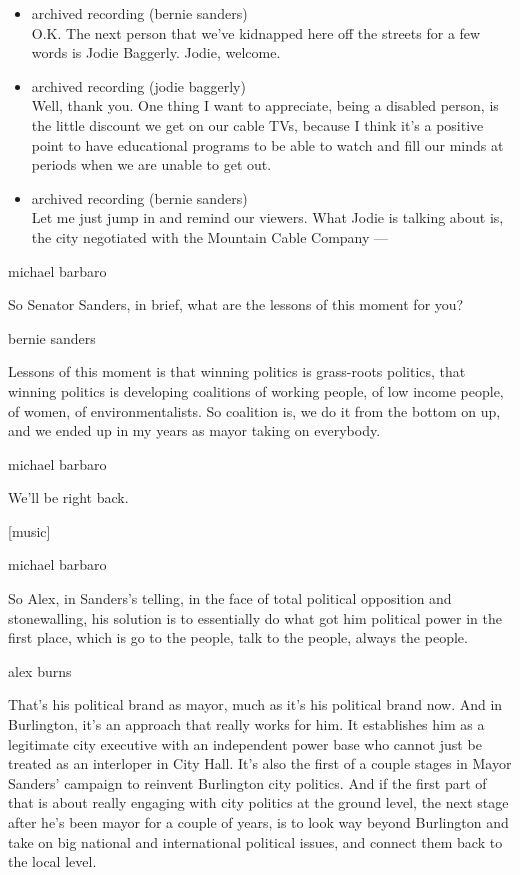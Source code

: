 \begin{itemize}
\item
  archived recording (bernie sanders)\\
  O.K. The next person that we've kidnapped here off the streets for a
  few words is Jodie Baggerly. Jodie, welcome.
\item
  archived recording (jodie baggerly)\\
  Well, thank you. One thing I want to appreciate, being a disabled
  person, is the little discount we get on our cable TVs, because I
  think it's a positive point to have educational programs to be able to
  watch and fill our minds at periods when we are unable to get out.
\item
  archived recording (bernie sanders)\\
  Let me just jump in and remind our viewers. What Jodie is talking
  about is, the city negotiated with the Mountain Cable Company ---
\end{itemize}

michael barbaro

So Senator Sanders, in brief, what are the lessons of this moment for
you?

bernie sanders

Lessons of this moment is that winning politics is grass-roots politics,
that winning politics is developing coalitions of working people, of low
income people, of women, of environmentalists. So coalition is, we do it
from the bottom on up, and we ended up in my years as mayor taking on
everybody.

michael barbaro

We'll be right back.

{[}music{]}

michael barbaro

So Alex, in Sanders's telling, in the face of total political opposition
and stonewalling, his solution is to essentially do what got him
political power in the first place, which is go to the people, talk to
the people, always the people.

alex burns

That's his political brand as mayor, much as it's his political brand
now. And in Burlington, it's an approach that really works for him. It
establishes him as a legitimate city executive with an independent power
base who cannot just be treated as an interloper in City Hall. It's also
the first of a couple stages in Mayor Sanders' campaign to reinvent
Burlington city politics. And if the first part of that is about really
engaging with city politics at the ground level, the next stage after
he's been mayor for a couple of years, is to look way beyond Burlington
and take on big national and international political issues, and connect
them back to the local level.

